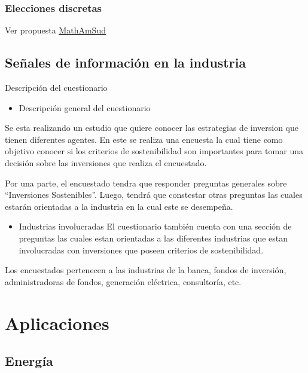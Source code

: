\documentclass[
]{book}
\providecommand{\tightlist}{%
  \setlength{\itemsep}{0pt}\setlength{\parskip}{0pt}}
\begin{document}
\hypertarget{elecciones-discretas}{%
\subsection{Elecciones discretas}\label{elecciones-discretas}}

Ver propuesta \href{https://sebacea.github.io/drivers/DiscreteRI}{MathAmSud}

\hypertarget{seuxf1ales-de-informaciuxf3n-en-la-industria}{%
\section{Señales de información en la industria}\label{seuxf1ales-de-informaciuxf3n-en-la-industria}}

Descripción del cuestionario

\begin{itemize}
\tightlist
\item
  Descripción general del cuestionario
\end{itemize}

Se esta realizando un estudio que quiere conocer las estrategias de inversion que tienen diferentes agentes. En este se realiza una encuesta la cual tiene como objetivo conocer si los criterios de sostenibilidad son importantes para tomar una decisión sobre las inversiones que realiza el encuestado.

Por una parte, el encuestado tendra que responder preguntas generales sobre ``Inversiones Sostenibles''. Luego, tendrá que constestar otras preguntas las cuales estarán orientadas a la industria en la cual este se desempeña.

\begin{itemize}
\tightlist
\item
  Industrias involucradas
  El cuestionario también cuenta con una sección de preguntas las cuales estan orientadas a las diferentes industrias que estan involucradas con inversiones que poseen criterios de sostenibilidad.
\end{itemize}

Los encuestados pertenecen a las industrias de la banca, fondos de inversión, administradoras de fondos, generación eléctrica, consultoría, etc.

\hypertarget{aplicaciones}{%
\chapter{Aplicaciones}\label{aplicaciones}}

\hypertarget{energuxeda}{%
\section{Energía}\label{energuxeda}}
\end{document}
